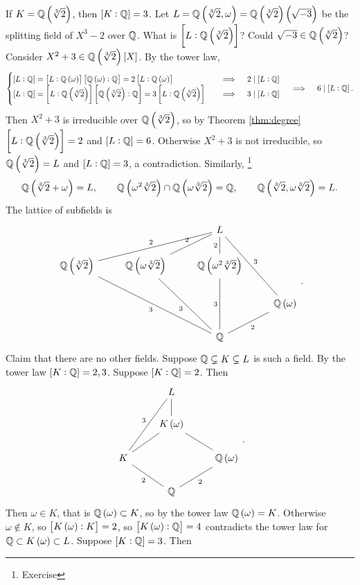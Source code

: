 If $ K = \QQ\br{\sqrt[3]{2}} $, then $ \sbr{K : \QQ} = 3 $. Let $ L = \QQ\br{\sqrt[3]{2}, \omega} = \QQ\br{\sqrt[3]{2}}\br{\sqrt{-3}} $ be the splitting field of $ X^3 - 2 $ over $ \mathbb{Q} $. What is $ \sbr{L : \QQ\br{\sqrt[3]{2}}} $? Could $ \sqrt{-3} \in \QQ\br{\sqrt[3]{2}} $? Consider $ X^2 + 3 \in \QQ\br{\sqrt[3]{2}}\sbr{X} $. By the tower law,
$$
\begin{cases}
\sbr{L : \QQ} = \sbr{L : \QQ\br{\omega}}\sbr{\QQ\br{\omega} : \QQ} = 2\sbr{L : \QQ\br{\omega}} & \quad \implies \quad 2 \mid \sbr{L : \QQ} \\
\sbr{L : \QQ} = \sbr{L : \QQ\br{\sqrt[3]{2}}}\sbr{\QQ\br{\sqrt[3]{2}} : \QQ} = 3\sbr{L : \QQ\br{\sqrt[3]{2}}} & \quad \implies \quad 3 \mid \sbr{L : \QQ}
\end{cases}
\quad \implies \quad 6 \mid \sbr{L : \QQ}.
$$
Then $ X^2 + 3 $ is irreducible over $ \QQ\br{\sqrt[3]{2}} $, so by Theorem \ref{thm:degree} $ \sbr{L : \QQ\br{\sqrt[3]{2}}} = 2 $ and $ \sbr{L : \QQ} = 6 $. Otherwise $ X^2 + 3 $ is not irreducible, so $ \QQ\br{\sqrt[3]{2}} = L $ and $ \sbr{L : \QQ} = 3 $, a contradiction. Similarly, \footnote{Exercise}
$$ \QQ\br{\sqrt[3]{2} + \omega} = L, \qquad \QQ\br{\omega^2\sqrt[3]{2}} \cap \QQ\br{\omega\sqrt[3]{2}} = \QQ, \qquad \QQ\br{\sqrt[3]{2}, \omega\sqrt[3]{2}} = L. $$
The lattice of subfields is
$$
\begin{tikzcd}
& & L & \\
\QQ\br{\sqrt[3]{2}} \arrow[dash]{urr}{2} & \QQ\br{\omega\sqrt[3]{2}} \arrow[dash]{ur}{2} & \QQ\br{\omega^2\sqrt[3]{2}} \arrow[dash]{u}{2} & \\
& & & \QQ\br{\omega} \arrow[dash, swap]{uul}{3} \\
& & \QQ \arrow[dash]{uull}{3} \arrow[dash]{uul}{3} \arrow[dash]{uu}{3} \arrow[dash, swap]{ur}{2} &
\end{tikzcd}.
$$
Claim that there are no other fields. Suppose $ \mathbb{Q} \subsetneq K \subsetneq L $ is such a field. By the tower law $ \sbr{K : \QQ} = 2, 3 $. Suppose $ \sbr{K : \QQ} = 2 $. Then
$$
\begin{tikzcd}
& L & \\
& K\br{\omega} \arrow[dash]{u} & \\
K \arrow[dash]{uur}{3} \arrow[dash]{ur} & & \QQ\br{\omega} \arrow[dash]{ul} \\
& \QQ \arrow[dash]{ul}{2} \arrow[dash, swap]{ur}{2} &
\end{tikzcd}.
$$
Then $ \omega \in K $, that is $ \QQ\br{\omega} \subset K $, so by the tower law $ \QQ\br{\omega} = K $. Otherwise $ \omega \notin K $, so $ \sbr{K\br{\omega} : K} = 2 $, so $ \sbr{K\br{\omega} : \QQ} = 4 $ contradicts the tower law for $ \QQ \subset K\br{\omega} \subset L $. Suppose $ \sbr{K : \QQ} = 3 $. Then
